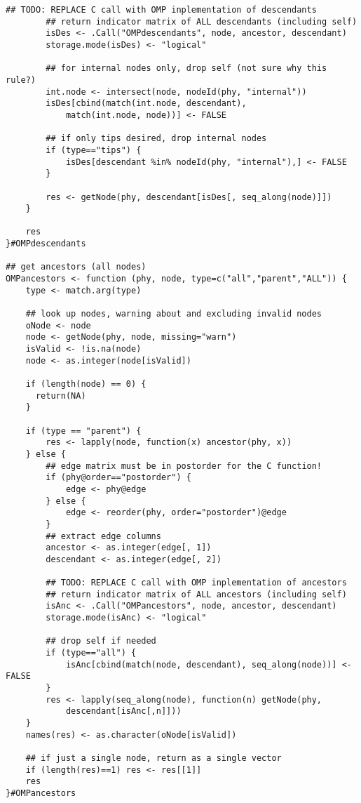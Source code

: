 \documentclass[11pt,letterpaper]{article}
\begin{document}
\begin{lstlisting}[style=MyR]
        ## TODO: REPLACE C call with OMP inplementation of descendants
        ## return indicator matrix of ALL descendants (including self)
        isDes <- .Call("OMPdescendants", node, ancestor, descendant)
        storage.mode(isDes) <- "logical"

        ## for internal nodes only, drop self (not sure why this rule?)
        int.node <- intersect(node, nodeId(phy, "internal"))
        isDes[cbind(match(int.node, descendant),
            match(int.node, node))] <- FALSE
        
        ## if only tips desired, drop internal nodes
        if (type=="tips") {
            isDes[descendant %in% nodeId(phy, "internal"),] <- FALSE
        }
        
        res <- getNode(phy, descendant[isDes[, seq_along(node)]])
    }

    res
}#OMPdescendants

## get ancestors (all nodes)
OMPancestors <- function (phy, node, type=c("all","parent","ALL")) {
    type <- match.arg(type)

    ## look up nodes, warning about and excluding invalid nodes
    oNode <- node
    node <- getNode(phy, node, missing="warn")
    isValid <- !is.na(node)
    node <- as.integer(node[isValid])

    if (length(node) == 0) {
      return(NA)
    }
    
    if (type == "parent") {
        res <- lapply(node, function(x) ancestor(phy, x))
    } else {
        ## edge matrix must be in postorder for the C function!
        if (phy@order=="postorder") {
            edge <- phy@edge
        } else {
            edge <- reorder(phy, order="postorder")@edge
        }
        ## extract edge columns
        ancestor <- as.integer(edge[, 1])
        descendant <- as.integer(edge[, 2])
        
        ## TODO: REPLACE C call with OMP inplementation of ancestors
        ## return indicator matrix of ALL ancestors (including self)
        isAnc <- .Call("OMPancestors", node, ancestor, descendant)
        storage.mode(isAnc) <- "logical"

        ## drop self if needed
        if (type=="all") {
            isAnc[cbind(match(node, descendant), seq_along(node))] <- FALSE
        }
        res <- lapply(seq_along(node), function(n) getNode(phy,
            descendant[isAnc[,n]]))
    }
    names(res) <- as.character(oNode[isValid])

    ## if just a single node, return as a single vector
    if (length(res)==1) res <- res[[1]]
    res
}#OMPancestors


\end{lstlisting}
\end{document}
